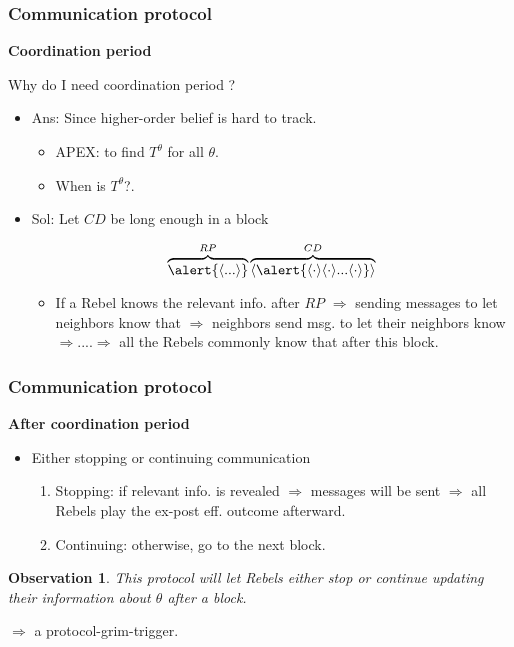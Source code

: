 \documentclass[10pt]{beamer}
\newtheorem*{observation}{Observation}
\begin{document}
\begin{frame}
  \frametitle{Communication protocol}

\textbf{Coordination period}

Why do I need coordination period ?
\begin{itemize}
\item Ans: Since higher-order belief is hard to track.

\begin{itemize}
\item APEX: to find $T^{\theta}$ for all $\theta$.
\item When is $T^{\theta}$?.
\end{itemize}
\item Sol: Let $CD$ be long enough in a block

\[\overbrace{\alert{\langle ... \rangle}}^{RP}\overbrace{\langle \alert{\langle \cdot \rangle \langle \cdot \rangle...\langle \cdot \rangle}\rangle}^{CD}\] 
\begin{itemize}
\item If a Rebel knows the relevant info. after $RP$ $\Rightarrow$ sending messages to let neighbors know that {$\Rightarrow$ neighbors send msg. to let their neighbors know $\Rightarrow$....$\Rightarrow$ \alert{all the Rebels commonly know that after this block}.}
\end{itemize}

\end{itemize}

\end{frame}


\begin{frame}
\frametitle{Communication protocol}

\textbf{After coordination period}

\begin{itemize}
\item Either stopping or continuing communication
\begin{enumerate}
\item \alert{Stopping}: if relevant info. is revealed $\Rightarrow$ messages will be sent $\Rightarrow$ all Rebels play the ex-post eff. outcome afterward. 
\item \alert{Continuing}: otherwise, go to the next block.
\end{enumerate}

\end{itemize}

\begin{observation}
This protocol will let Rebels either stop or continue updating their information about $\theta$ after a block.
\end{observation}

$\Rightarrow$ a \alert{protocol-grim-trigger}. 
\end{frame}
\end{document}
